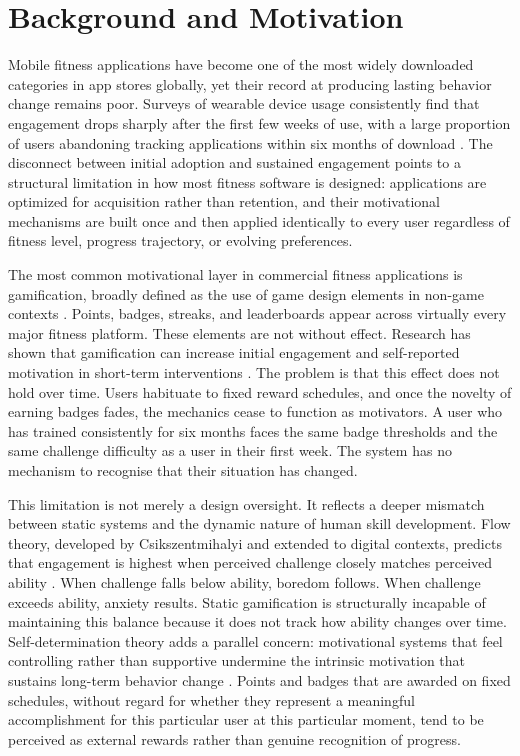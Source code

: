 \documentclass[12pt, a4paper]{report}
\begin{document}
\section{Background and Motivation}

Mobile fitness applications have become one of the most widely downloaded categories in app stores globally, yet their record at producing lasting behavior change remains poor. Surveys of wearable device usage consistently find that engagement drops sharply after the first few weeks of use, with a large proportion of users abandoning tracking applications within six months of download \citep{ledger2014}. The disconnect between initial adoption and sustained engagement points to a structural limitation in how most fitness software is designed: applications are optimized for acquisition rather than retention, and their motivational mechanisms are built once and then applied identically to every user regardless of fitness level, progress trajectory, or evolving preferences.

The most common motivational layer in commercial fitness applications is gamification, broadly defined as the use of game design elements in non-game contexts \citep{deterding2011}. Points, badges, streaks, and leaderboards appear across virtually every major fitness platform. These elements are not without effect. Research has shown that gamification can increase initial engagement and self-reported motivation in short-term interventions \citep{johnson2016}. The problem is that this effect does not hold over time. Users habituate to fixed reward schedules, and once the novelty of earning badges fades, the mechanics cease to function as motivators. A user who has trained consistently for six months faces the same badge thresholds and the same challenge difficulty as a user in their first week. The system has no mechanism to recognise that their situation has changed.

This limitation is not merely a design oversight. It reflects a deeper mismatch between static systems and the dynamic nature of human skill development. Flow theory, developed by Csikszentmihalyi and extended to digital contexts, predicts that engagement is highest when perceived challenge closely matches perceived ability \citep{nakamura2014}. When challenge falls below ability, boredom follows. When challenge exceeds ability, anxiety results. Static gamification is structurally incapable of maintaining this balance because it does not track how ability changes over time. Self-determination theory adds a parallel concern: motivational systems that feel controlling rather than supportive undermine the intrinsic motivation that sustains long-term behavior change \citep{ryan2000}. Points and badges that are awarded on fixed schedules, without regard for whether they represent a meaningful accomplishment for this particular user at this particular moment, tend to be perceived as external rewards rather than genuine recognition of progress.
\end{document}
